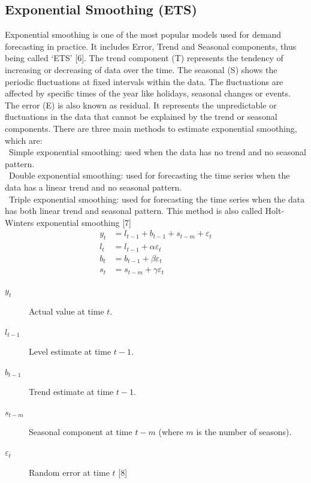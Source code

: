 \documentclass{ieeeojies}
\begin{document}
\subsection{Exponential Smoothing (ETS)}
Exponential smoothing is one of the most popular models used for demand forecasting in practice. It includes Error, Trend and Seasonal components, thus being called ‘ETS’ [6].
The trend component (T) represents the tendency of increasing or decreasing of data over the time. The seasonal (S) shows the periodic fluctuations at fixed intervals within the data. The fluctuations are affected by specific times of the year like holidays, seasonal changes or events. The error (E) is also known as residual. It represents the unpredictable or fluctuations in the data that cannot be explained by the trend or seasonal components.
There are three main methods to estimate exponential smoothing, which are: \\
    \indent\textbullet\ Simple exponential smoothing: used when the data has no trend and no seasonal pattern. \\
    \indent\textbullet\ Double exponential smoothing: used for forecasting the time series when the data has a linear trend and no seasonal pattern. \\
    \indent\textbullet\ Triple exponential smoothing: used for forecasting the time series when the data has both linear trend and seasonal pattern. This method is also called Holt-Winters exponential smoothing [7]
        \begin{align*}
        y_t &= l_{t-1} + b_{t-1} + s_{t-m} + \varepsilon_t \\
        l_t &= l_{t-1} + \alpha \varepsilon_t \\
        b_t &= b_{t-1} + \beta \varepsilon_t \\
        s_t &= s_{t-m} + \gamma \varepsilon_t
        \end{align*}
    \begin{description}
  \item[$y_t$] Actual value at time $t$.
  \item[$l_{t-1}$] Level estimate at time $t-1$.
  \item[$b_{t-1}$] Trend estimate at time $t-1$.
  \item[$s_{t-m}$] Seasonal component at time $t-m$ (where $m$ is the number of seasons).
  \item[$\varepsilon_t$] Random error at time $t$ [8]
\end{description}
\end{document}
